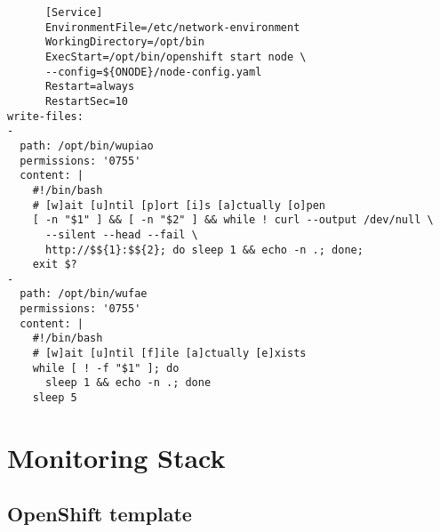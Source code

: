 \begin{verbatim}
      [Service]
      EnvironmentFile=/etc/network-environment
      WorkingDirectory=/opt/bin
      ExecStart=/opt/bin/openshift start node \
      --config=${ONODE}/node-config.yaml
      Restart=always
      RestartSec=10
write-files:
-
  path: /opt/bin/wupiao
  permissions: '0755'
  content: |
    #!/bin/bash
    # [w]ait [u]ntil [p]ort [i]s [a]ctually [o]pen
    [ -n "$1" ] && [ -n "$2" ] && while ! curl --output /dev/null \
      --silent --head --fail \
      http://$${1}:$${2}; do sleep 1 && echo -n .; done;
    exit $?
-
  path: /opt/bin/wufae
  permissions: '0755'
  content: |
    #!/bin/bash
    # [w]ait [u]ntil [f]ile [a]ctually [e]xists
    while [ ! -f "$1" ]; do
      sleep 1 && echo -n .; done
    sleep 5
\end{verbatim}

\section{Monitoring Stack}\label{monitoring-stack}

\subsection{OpenShift template}\label{openshift-template-1}


